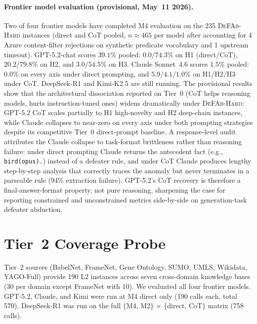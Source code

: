 \documentclass{article}
\theoremstyle{definition}
\begin{document}
\paragraph{Frontier model evaluation (provisional, May~11 2026).}
Two of four frontier models have completed M4 evaluation on the 235 \textsc{DeFAb-Hard} instances (direct and CoT pooled, $n \approx 465$ per model after accounting for 4 Azure content-filter rejections on synthetic predicate vocabulary and 1 upstream timeout). GPT-5.2-chat scores $39.1\%$ pooled: $0.0/74.3\%$ on H1 (direct/CoT), $20.2/79.8\%$ on H2, and $3.0/54.5\%$ on H3. Claude Sonnet~4.6 scores $1.5\%$ pooled: $0.0\%$ on every axis under direct prompting, and $5.9/4.1/1.0\%$ on H1/H2/H3 under CoT. DeepSeek-R1 and Kimi-K2.5 are still running. The provisional results show that the architectural dissociation reported on Tier~0 (CoT helps reasoning models, hurts instruction-tuned ones) widens dramatically under \textsc{DeFAb-Hard}: GPT-5.2 CoT scales partially to H1 high-novelty and H2 deep-chain instances, while Claude collapses to near-zero on every axis under both prompting strategies despite its competitive Tier~0 direct-prompt baseline. A response-level audit attributes the Claude collapse to task-format brittleness rather than reasoning failure: under direct prompting Claude returns the antecedent fact (e.g., \texttt{bird(opus).}) instead of a defeater rule, and under CoT Claude produces lengthy step-by-step analysis that correctly traces the anomaly but never terminates in a parseable rule (94\% extraction failure). GPT-5.2's CoT recovery is therefore a final-answer-format property, not pure reasoning, sharpening the case for reporting constrained and unconstrained metrics side-by-side on generation-task defeater abduction.

\section{Tier~2 Coverage Probe}\label{app:tier2}

Tier~2 sources (BabelNet, FrameNet, Gene Ontology, SUMO, UMLS, Wikidata, YAGO-Full) provide 190 L2 instances across seven cross-domain knowledge bases (30 per domain except FrameNet with 10). We evaluated all four frontier models. GPT-5.2, Claude, and Kimi were run at M4 direct only (190 calls each, total 570). DeepSeek-R1 was run on the full $\{$M4, M2$\}$ $\times$ $\{$direct, CoT$\}$ matrix (758 calls).
\end{document}
